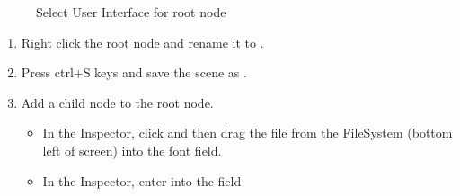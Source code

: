 \documentclass[a4paper,12pt,english]{sphinxmanual}
\begin{document}
\begin{figure}[htbp]
\centering
\capstart

\noindent{}
\caption{Select User Interface for root node}\label{\detokenize{tutorial:id5}}\end{figure}
\begin{enumerate}
%
\setcounter{enumi}{2}
\item {} 
\sphinxAtStartPar
Right click the root node  and rename it to .

\item {} 
\sphinxAtStartPar
Press ctrl+S keys and save the scene as .

\item {} 
\sphinxAtStartPar
Add a  child node to the root node.
\begin{itemize}
\item {} 
\sphinxAtStartPar
In the Inspector, click  and then drag the
 file from the FileSystem (bottom left of screen)
into the \sphinxstylestrong{{[}empty{]}} font field.

\item {} 
\sphinxAtStartPar
In the Inspector, enter into the  field

\end{itemize}

\end{enumerate}
\end{document}
